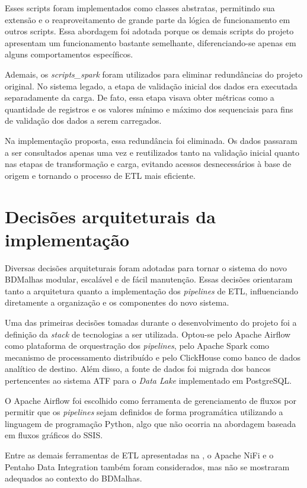 Esses scripts foram implementados como classes abstratas, permitindo sua extensão e o reaproveitamento de 
grande parte da lógica de funcionamento em outros scripts. Essa abordagem foi adotada porque os demais scripts 
do projeto apresentam um funcionamento bastante semelhante, diferenciando-se apenas em alguns comportamentos 
específicos.

Ademais, os \textit{scripts\_spark} foram utilizados para eliminar redundâncias do projeto original.
No sistema legado, a etapa de validação inicial dos dados era executada separadamente da carga. 
De fato, essa etapa visava obter métricas como a quantidade de registros e os valores mínimo e máximo dos sequenciais 
para fins de validação dos dados a serem carregados.

Na implementação proposta, essa redundância foi eliminada. Os dados passaram a ser consultados apenas uma vez e 
reutilizados tanto na validação inicial quanto nas etapas de transformação e carga, evitando acessos desnecessários 
à base de origem e tornando o processo de ETL mais eficiente.

\section{Decisões arquiteturais da implementação}

Diversas decisões arquiteturais foram adotadas para tornar o sistema do novo BDMalhas modular, 
escalável e de fácil manutenção. Essas decisões orientaram tanto a arquitetura quanto a implementação 
dos \textit{pipelines} de ETL, influenciando diretamente a organização e os componentes do novo sistema.

Uma das primeiras decisões tomadas durante o desenvolvimento do projeto foi a definição da \textit{stack} de 
tecnologias a ser utilizada. Optou-se pelo Apache Airflow como plataforma de orquestração dos \textit{pipelines}, 
pelo Apache Spark como mecanismo de processamento distribuído e pelo ClickHouse como 
banco de dados analítico de destino. Além disso, a fonte de dados foi migrada dos bancos pertencentes ao 
sistema ATF para o \textit{Data Lake} implementado em PostgreSQL.

O Apache Airflow foi escolhido como ferramenta de gerenciamento de fluxos por permitir que os
\textit{pipelines} sejam definidos de forma programática utilizando a linguagem de programação Python, algo que
não ocorria na abordagem baseada em fluxos gráficos do SSIS.

Entre as demais ferramentas de ETL apresentadas na , o Apache NiFi e o
Pentaho Data Integration também foram considerados, mas não se mostraram adequados ao contexto do
BDMalhas. 

